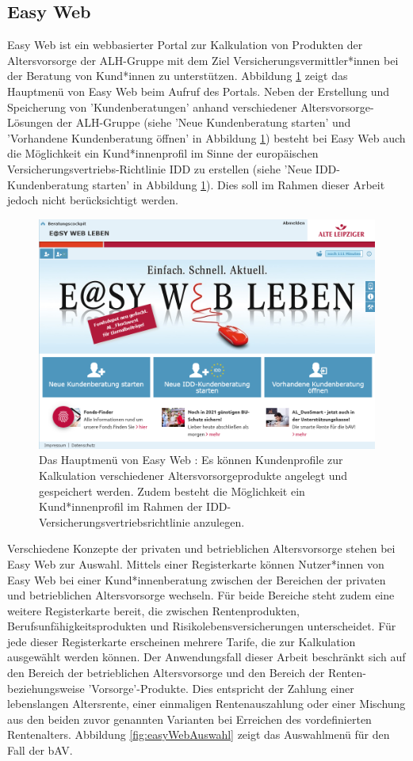 \subsection{Easy Web}

Easy Web \cite{easy_web} ist ein webbasierter Portal zur Kalkulation von Produkten der Altersvorsorge der ALH-Gruppe mit dem Ziel Versicherungsvermittler*innen bei der Beratung von Kund*innen zu unterstützen. Abbildung \ref{fig:easyWeballg} zeigt das Hauptmenü von Easy Web beim Aufruf des Portals. Neben der Erstellung und Speicherung von 'Kundenberatungen' anhand verschiedener Altersvorsorge-Lösungen der ALH-Gruppe (siehe 'Neue Kundenberatung starten' und 'Vorhandene Kundenberatung öffnen' in Abbildung \ref{fig:easyWeballg}) besteht bei Easy Web auch die Möglichkeit ein Kund*innenprofil im Sinne der europäischen Versicherungsvertriebs-Richtlinie IDD zu erstellen (siehe 'Neue IDD-Kundenberatung starten' in Abbildung \ref{fig:easyWeballg}). Dies soll im Rahmen dieser Arbeit jedoch nicht berücksichtigt werden. 

\begin{figure}
\centering
\includegraphics[width=0.8\columnwidth]{images/Easy_Web_Leben_allgemein.png}
\caption{Das Hauptmenü von Easy Web \cite{easy_web}: Es können Kundenprofile zur Kalkulation verschiedener Altersvorsorgeprodukte angelegt und gespeichert werden. Zudem besteht die Möglichkeit ein Kund*innenprofil im Rahmen der IDD-Versicherungsvertriebsrichtlinie anzulegen.}
\label{fig:easyWeballg}
\end{figure}

Verschiedene Konzepte der privaten und betrieblichen Altersvorsorge stehen bei Easy Web zur Auswahl. Mittels einer Registerkarte können Nutzer*innen von Easy Web bei einer Kund*innenberatung zwischen der Bereichen der privaten und betrieblichen Altersvorsorge wechseln. Für beide Bereiche steht zudem eine weitere Registerkarte bereit, die zwischen Rentenprodukten, Berufsunfähigkeitsprodukten und Risikolebensversicherungen unterscheidet. Für jede dieser Registerkarte erscheinen mehrere Tarife, die zur Kalkulation ausgewählt werden können. Der Anwendungsfall dieser Arbeit beschränkt sich auf den Bereich der betrieblichen Altersvorsorge und den Bereich der Renten- beziehungsweise 'Vorsorge'-Produkte. Dies entspricht der Zahlung einer lebenslangen Altersrente, einer einmaligen Rentenauszahlung oder einer Mischung aus den beiden zuvor genannten Varianten bei Erreichen des vordefinierten Rentenalters. Abbildung \ref{fig:easyWebAuswahl} zeigt das Auswahlmenü für den Fall der bAV.

